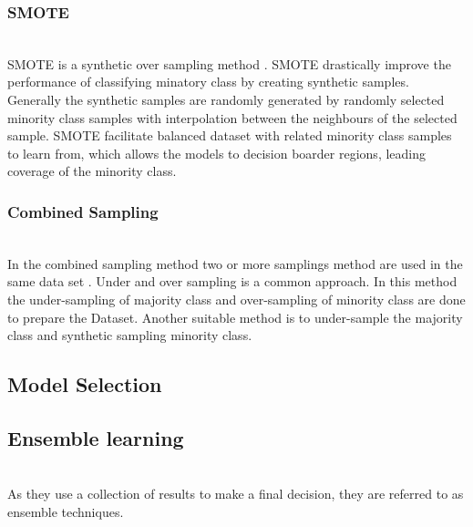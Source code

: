 \subsubsection{SMOTE}\hspace*{\fill} \\
SMOTE is a synthetic over sampling method \cite{2002}. SMOTE drastically improve the performance of classifying minatory class by creating synthetic samples. Generally the synthetic samples are randomly generated by randomly selected minority class samples with interpolation between the neighbours of the selected sample. SMOTE facilitate balanced dataset with related minority class samples to learn from, which allows the models to decision boarder regions,  leading coverage of the minority class.

\subsubsection{Combined Sampling}\hspace*{\fill} \\
In the combined sampling method two or more samplings method are used in the same data set \cite{10.1145/3055635.3056643}. Under and over sampling is a common approach. In this method the under-sampling of majority class and over-sampling of minority class are done to prepare the Dataset. Another suitable method is to under-sample the majority class and synthetic sampling minority class. 

\subsection{Model Selection}\label{subsec:model-selection}

\subsection{Ensemble learning}\label{subsec:ensemble-learning}\hspace*{\fill} \\
As they use a collection of results to make a final decision, they are referred to as ensemble techniques.


